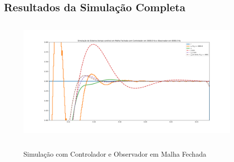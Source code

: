 \documentclass[
	12pt,				%
	article,			%
	openright,			%
	oneside,
	a4paper,			%
	chapter=TITLE,		%
	section=TITLE,		%
	english,			%
	french,				%
	spanish,			%
	brazil,				%
]{abntex2}
\begin{document}
	
	\begin{apendicesenv}
		\partapendices
% 		
        \clearpage
	
    	\chapter{Resultados da Simulação Completa}
        	\label{ap-simul}
        	
        	\FloatBarrier
        	
        	\begin{figure}[htbp]
                	\centering
                	\caption{Simulação com Controlador e Observador em Malha Fechada}
                	\includegraphics[width=\textwidth,height=240px,keepaspectratio]{imgs/step_response_closedloop_observer_zoom_stepup.png}
                	\label{fig-step_response_closedloop_observer_zoom_stepup}
        	\end{figure}
        	

\end{apendicesenv}
\end{document}
